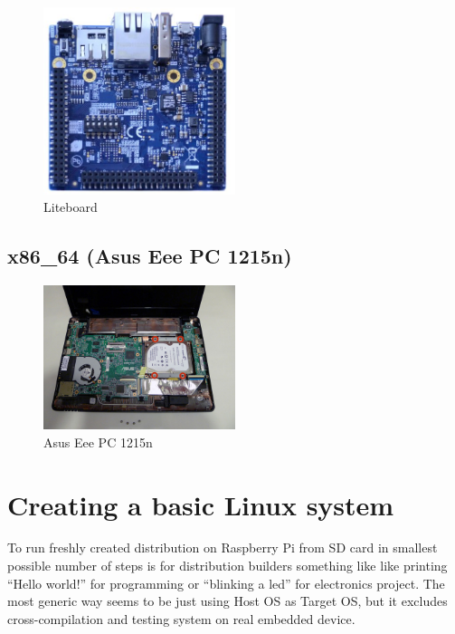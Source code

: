 \documentclass[printmode]{mgr}
\begin{document}
\begin{figure}[htbp]
  \centering
    \includegraphics[width=0.5\textwidth]{liteboard-front.jpg}
  \caption{Liteboard}
  \label{fig:devboard-liteboard}
\end{figure}

\section{x86\_64 (Asus Eee PC 1215n)}

\begin{figure}[htbp]
  \centering
    \includegraphics[width=0.5\textwidth]{1215n-front.jpg}
  \caption{Asus Eee PC 1215n}
  \label{fig:devboard-1215n}
\end{figure}


\chapter{Creating a basic Linux system}
\label{chapter:basic-system}


To run freshly created distribution on Raspberry Pi from SD card in smallest possible number of steps is for distribution builders something like like printing ``Hello world!'' for programming or ``blinking a led'' for electronics project. The most generic way seems to be just using Host OS as Target OS, but it excludes cross-compilation and testing system on real embedded device.
\end{document}

